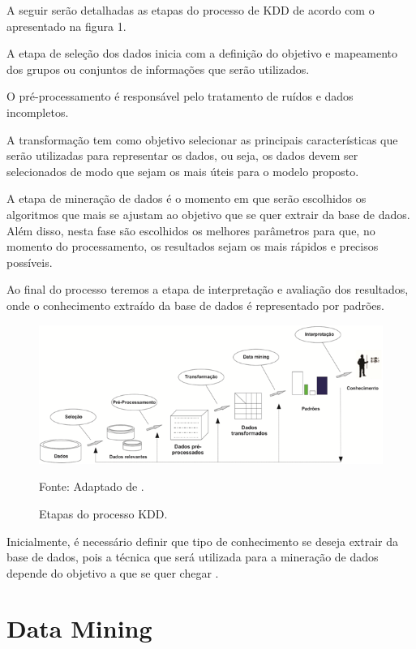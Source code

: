 \documentclass[
	12pt,				%
	openright,			%
	oneside,	
	a4paper,				%
	english,				%
	brazil				%
]{abntex2/abntex2} %
\begin{document}
	A seguir serão detalhadas as etapas do processo de KDD de acordo com o apresentado na figura 1.
	
	A etapa de seleção dos dados inicia com a definição do objetivo e mapeamento  dos grupos ou conjuntos de informações que serão utilizados.
	
	O pré-processamento é responsável pelo tratamento de ruídos e dados incompletos.
	
	A transformação tem como objetivo selecionar as principais características que serão utilizadas para representar os dados, ou seja, os dados devem ser selecionados de  modo que sejam os mais úteis para o modelo proposto.
	
	A etapa de mineração de dados é o momento em que serão escolhidos os  algoritmos que mais se ajustam ao objetivo que se quer extrair da base de dados. Além disso, nesta fase são escolhidos os melhores parâmetros para que, no momento do processamento, os resultados sejam os mais rápidos e precisos possíveis.
	
	Ao final do processo teremos a etapa de interpretação e avaliação dos resultados, onde o conhecimento extraído da base de dados é representado por padrões.
\\
		\begin{figure}[h!]
			\caption{\label{figDataMiningFayyad} Etapas do processo KDD.}
			\begin{center}
			    \includegraphics[scale=1]{img/dataMiningFayyad.png}
			\end{center}
			Fonte: Adaptado de \cite{fayyad:1996}.
		\end{figure}
		
		Inicialmente, é necessário definir que tipo de conhecimento se deseja extrair da base de dados, pois a técnica que será utilizada para a mineração de dados depende do objetivo a que se quer chegar \cite{damasceno:2005}.
		
	\section{Data Mining}
	
\end{document}
